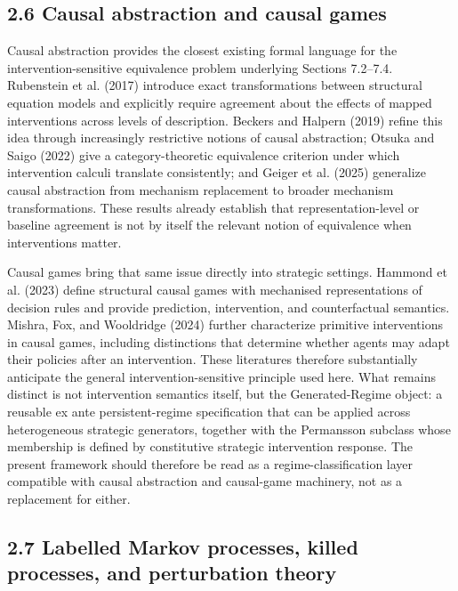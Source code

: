 \documentclass[10pt]{article}
\begin{document}
\subsection{2.6 Causal abstraction and causal games}\label{causal-abstraction-and-causal-games}

Causal abstraction provides the closest existing formal language for the
intervention-sensitive equivalence problem underlying Sections 7.2--7.4.
Rubenstein et al. (2017) introduce exact transformations between structural
equation models and explicitly require agreement about the effects of mapped
interventions across levels of description. Beckers and Halpern (2019) refine
this idea through increasingly restrictive notions of causal abstraction;
Otsuka and Saigo (2022) give a category-theoretic equivalence criterion under
which intervention calculi translate consistently; and Geiger et al. (2025)
generalize causal abstraction from mechanism replacement to broader mechanism
transformations. These results already establish that representation-level or
baseline agreement is not by itself the relevant notion of equivalence when
interventions matter.

Causal games bring that same issue directly into strategic settings. Hammond
et al. (2023) define structural causal games with mechanised representations of
decision rules and provide prediction, intervention, and counterfactual
semantics. Mishra, Fox, and Wooldridge (2024) further characterize primitive
interventions in causal games, including distinctions that determine whether
agents may adapt their policies after an intervention. These literatures
therefore substantially anticipate the general intervention-sensitive
principle used here. What remains distinct is not intervention semantics
itself, but the Generated-Regime object: a reusable ex ante persistent-regime
specification that can be applied across heterogeneous strategic generators,
together with the Permansson subclass whose membership is defined by
constitutive strategic intervention response. The present framework should
therefore be read as a regime-classification layer compatible with causal
abstraction and causal-game machinery, not as a replacement for either.


\subsection{2.7 Labelled Markov processes, killed processes, and perturbation theory}\label{labelled-killed-perturbation}
\end{document}
